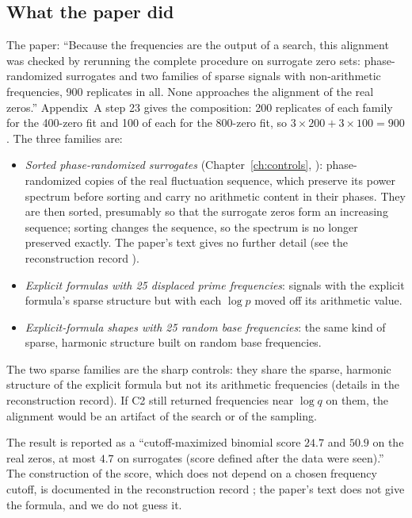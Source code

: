 \subsection{What the paper did}

The paper: ``Because the frequencies are the output of a search, this alignment was checked by rerunning the complete procedure on surrogate zero sets: phase-randomized surrogates and two families of sparse signals with non-arithmetic frequencies, 900 replicates in all. None approaches the alignment of the real zeros.'' Appendix~A step 23 gives the composition: 200 replicates of each family for the 400-zero fit and 100 of each for the 800-zero fit, so $3\times200+3\times100=900$. The three families are:

\begin{itemize}
\item \emph{Sorted phase-randomized surrogates} (Chapter~\ref{ch:controls}, \cite{theiler}): phase-randomized copies of the real fluctuation sequence, which preserve its power spectrum before sorting and carry no arithmetic content in their phases. They are then sorted, presumably so that the surrogate zeros form an increasing sequence; sorting changes the sequence, so the spectrum is no longer preserved exactly. The paper's text gives no further detail (see the reconstruction record \cite{zenodo}).
\item \emph{Explicit formulas with 25 displaced prime frequencies}: signals with the explicit formula's sparse structure but with each $\log p$ moved off its arithmetic value.
\item \emph{Explicit-formula shapes with 25 random base frequencies}: the same kind of sparse, harmonic structure built on random base frequencies.
\end{itemize}
The two sparse families are the sharp controls: they share the sparse, harmonic structure of the explicit formula but not its arithmetic frequencies (details in the reconstruction record). If C2 still returned frequencies near $\log q$ on them, the alignment would be an artifact of the search or of the sampling.

The result is reported as a ``cutoff-maximized binomial score $24.7$ and $50.9$ on the real zeros, at most $4.7$ on surrogates (score defined after the data were seen).'' The construction of the score, which does not depend on a chosen frequency cutoff, is documented in the reconstruction record \cite{zenodo}; the paper's text does not give the formula, and we do not guess it.

